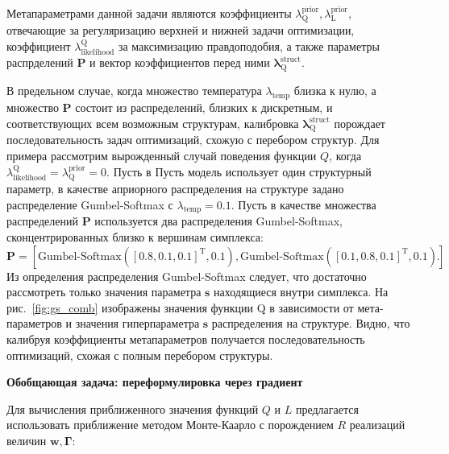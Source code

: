 Метапараметрами данной задачи являются коэффициенты $\lambda^\text{prior}_\text{Q}, \lambda^\text{prior}_\text{L}$, отвечающие за регуляризацию верхней и нижней задачи оптимизации, коэффициент $\lambda_\text{likelihood}^\text{Q}$ за максимизацию правдоподобия, а также параметры распрделений $\mathbf{P}$ и вектор коэффициентов перед ними $\boldsymbol{\lambda}^\text{struct}_\text{Q}$. 

В предельном случае, когда множество температура $\lambda_\text{temp}$ близка к нулю, а множество $\mathbf{P}$ состоит из распределений, близких к дискретным, и соответствующих всем возможным структурам, калибровка $\boldsymbol{\lambda}^\text{struct}_\text{Q}$ порождает последовательность задач оптимизаций, схожую с перебором структур.  Для примера рассмотрим вырожденный случай поведения функции $Q$, когда $\lambda_\text{likelihood}^\text{Q} = \lambda^\text{prior}_\text{Q} = 0$. Пусть в Пусть модель использует один структурный параметр, в качестве априорного распределения на структуре задано распределение Gumbel-Softmax с $\lambda_\text{temp}=0.1$. Пусть в качестве множества распределений $\mathbf{P}$ используется два распределения Gumbel-Softmax, сконцентрированных близко к вершинам симплекса:
\[
    \mathbf{P} = [\text{Gumbel-Softmax}([0.8, 0.1, 0.1]^\text{T}, 0.1) ,\text{Gumbel-Softmax}([0.1, 0.8, 0.1]^\text{T}, 0.1)].
\]
Из определения распределения Gumbel-Softmax следует, что достаточно рассмотреть только значения параметра $\mathbf{s}$ находящиеся внутри симплекса.
На рис.~\ref{fig:gs_comb} изображены значения функции Q в зависимости от мета-параметров и значения гиперпараметра $\mathbf{s}$ распределения на структуре. Видно, что калибруя коэффициенты метапараметров получается последовательность оптимизаций, схожая с полным перебором структуры.


\textbf{Обобщающая задача: переформулировка через градиент}



Для вычисления приближенного значения функций $Q$ и $L$ предлагается использовать приближение методом Монте-Каарло с порождением $R$ реализаций величин $\mathbf{w}, \boldsymbol{\Gamma}$:

